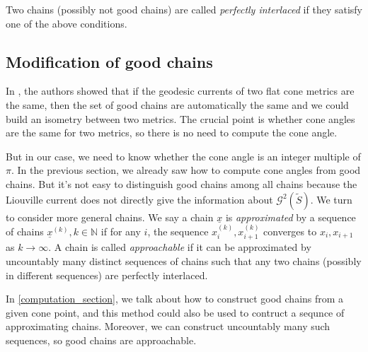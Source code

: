\documentclass[reqno]{amsart}
\theoremstyle{plain}
\theoremstyle{definition}
\theoremstyle{remark}
\theoremstyle{definition}
\newcommand{\N}{\mathbb N}
\newcommand{\?}{\textcolor{red}{?}}
\newcommand{\Gts}{\mathcal{G}^2(\tilde{S}) }
\begin{document}
Two chains (possibly not good chains) are called \textit{perfectly interlaced} if they satisfy one of the above conditions.




\subsection{Modification of good chains}

In \cite{bankovic2018marked}, the authors showed that if the geodesic currents of two flat cone metrics are the same, then the set of good chains are automatically the same and we could build an isometry between two metrics. The crucial point is whether cone angles are the same for two metrics, so there is no need to compute the cone angle.

But in our case, we need to know whether the cone angle is an integer multiple of $\pi$. In the previous section, we already saw how to compute cone angles from good chains. But it's not easy to distinguish good chains among all chains because the Liouville current does not directly give the information about $\Gts$. We turn to consider more general chains. We say a chain $\underline{x}$ is \textit{approximated} by a sequence of chains $\underline{x}^{(k)}, k\in\N$ if for any $i$, the sequence $x^{(k)}_i,x^{(k)}_{i+1}$ converges to $x_i,x_{i+1}$ as $k\to\infty$. A chain is called \textit{approachable} if it can be approximated by uncountably many distinct sequences of chains such that any two chains (possibly in different sequences) are perfectly interlaced. 

In \textsection\ref{computation_section}, we talk about how to construct good chains from a given cone point, and this method could also be used to contruct a sequnce of approximating chains. Moreover, we can construct uncountably many such sequences, so good chains are approachable.
\end{document}

